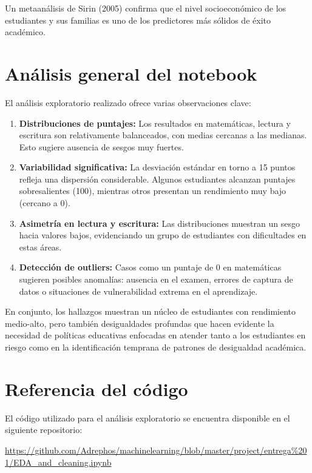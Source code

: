 \documentclass[12pt]{article}
\begin{document}
Un metaanálisis de Sirin (2005) confirma que el nivel socioeconómico de los estudiantes y sus familias 
es uno de los predictores más sólidos de éxito académico.

\section{Análisis general del notebook}
El análisis exploratorio realizado ofrece varias observaciones clave:

\begin{enumerate}
    \item \textbf{Distribuciones de puntajes:} Los resultados en matemáticas, lectura y escritura son relativamente balanceados, con medias cercanas a las medianas. Esto sugiere ausencia de sesgos muy fuertes.
    \item \textbf{Variabilidad significativa:} La desviación estándar en torno a 15 puntos refleja una dispersión considerable. Algunos estudiantes alcanzan puntajes sobresalientes (100), mientras otros presentan un rendimiento muy bajo (cercano a 0).
    \item \textbf{Asimetría en lectura y escritura:} Las distribuciones muestran un sesgo hacia valores bajos, evidenciando un grupo de estudiantes con dificultades en estas áreas.
    \item \textbf{Detección de outliers:} Casos como un puntaje de 0 en matemáticas sugieren posibles anomalías: ausencia en el examen, errores de captura de datos o situaciones de vulnerabilidad extrema en el aprendizaje.
\end{enumerate}

En conjunto, los hallazgos muestran un núcleo de estudiantes con rendimiento medio-alto, 
pero también desigualdades profundas que hacen evidente la necesidad de políticas educativas 
enfocadas en atender tanto a los estudiantes en riesgo como en la identificación temprana de 
patrones de desigualdad académica.

\section{Referencia del código}
El código utilizado para el análisis exploratorio se encuentra disponible en el siguiente repositorio:  

\url{https://github.com/Adrephos/machinelearning/blob/master/project/entrega\%201/EDA\_and\_cleaning.ipynb}
\end{document}
